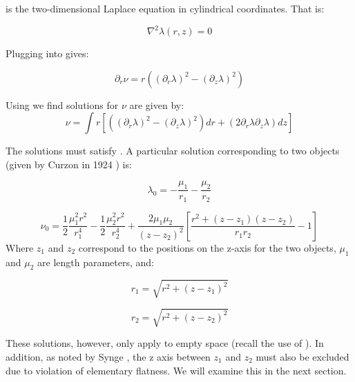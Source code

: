\documentclass{article}
\begin{document}
 is the two-dimensional Laplace equation in cylindrical coordinates. That is:

\begin{equation}
\nabla^2\lambda(r,z)=0
\label{eq:laplace-r-z}
\end{equation}

Plugging  into  gives:

\begin{equation}
\partial_{r}\nu=r\left(\left(\partial_{r}\lambda\right)^{2}-\left(\partial_{z}\lambda\right)^{2}\right)\label{eq:nu_r}
\end{equation}

Using  we find solutions for $\nu$ are given by:
\begin{equation}
\nu=\int r[\left(\left(\partial_{r}\lambda\right)^{2}-\left(\partial_{z}\lambda\right)^{2}\right)dr+\left(2\partial_{r}\lambda\partial_{z}\lambda\right)dz]\label{eq:nu}
\end{equation}

The solutions must satisfy . A particular solution corresponding to two objects (given by Curzon in 1924 \cite{curzon1924} ) is:

\begin{equation}
\lambda_0=-\frac{\mu_1}{r_1}-\frac{\mu_2}{r_2}
\label{eq:lambda-0}
\end{equation}

\begin{equation}
	\label{eq:nu-0}
	\nu_0=\frac{1}{2}\frac{\mu_{1}^{2}r^2}{r_{1}^{4}}-\frac{1}{2}\frac{\mu_{2}^{2}r^2}{r_{2}^{4}}+\frac{2\mu_1\mu_2}{(z-z_2)^2}\left[\frac{r^2+(z-z_1)(z-z_2)}{r_{1}r_{2}}-1\right]
\end{equation}
Where $z_1$ and $z_2$ correspond to the positions on the z-axis for the two objects, $\mu_1$ and $\mu_2$ are length parameters, and:

\begin{equation}
r_1=\sqrt{r^2+(z-z_1)^2}
\label{eq:r_1}
\end{equation}

\begin{equation}
r_2=\sqrt{r^2+(z-z_2)^2}
\label{eq:r_2}
\end{equation}

These solutions, however, only apply to empty space (recall the use of ). In addition, as noted by Synge \cite{synge_relativity}, the z axis between $z_1$ and $z_2$ must also be excluded due to violation of elementary flatness. We will examine this in the next section.
\end{document}
